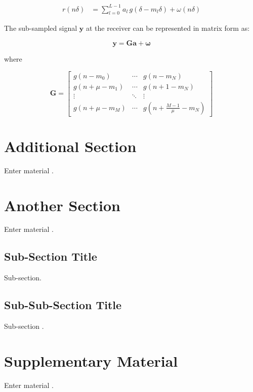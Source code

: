 \begin{align}
\label{eq:TimeModel2a}
r(n \delta) &= \sum_{l=0}^{L-1} a_l \, \mathit{g}(\delta - m_l \delta) + \omega(n \delta)
\end{align}

The sub-sampled signal $\mathbf{y}$ at the receiver can be represented in matrix form as:

\begin{equation}
\label{eq:LinModel01}
\mathbf{y} = \mathbf{G} \mathbf{a} + \boldsymbol{\omega}
\end{equation}

where

\begin{equation}
\label{eq:P}
\mathbf{G} = \left[
\begin{matrix}
\mathit{g}(n - m_0) & \cdots & \mathit{g}(n - m_N) \\
\mathit{g}(n + \mu - m_1) & \cdots & \mathit{g}(n + 1 - m_N) \\
\vdots & \ddots & \vdots \\
\mathit{g}(n + \mu - m_M) & \cdots & \mathit{g}(n + \frac{M-1}{\mu} - m_N)
\end{matrix}
\right]
\end{equation}

\section{Additional Section}
{Enter material \cite{Tesi2006}.}

\section{Another Section}
{Enter material \cite{Gezici2009}.}

\subsection{Sub-Section Title}
{Sub-section.}

\subsection{Sub-Sub-Section Title}
{Sub-section \cite{Carbonelli2003}.}

\section{Supplementary Material}
{Enter material \cite{Bajwa2010b}.}

